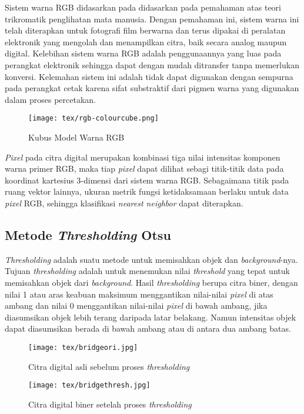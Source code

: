 \documentclass[laporan.tex]{subfiles}
\begin{document}
Sistem warna RGB didasarkan pada didasarkan pada pemahaman atas teori trikromatik penglihatan mata manusia. Dengan pemahaman ini, sistem warna ini telah diterapkan untuk fotografi film berwarna dan terus dipakai di peralatan elektronik yang mengolah dan menampilkan citra, baik secara analog maupun digital. Kelebihan sistem warna RGB adalah penggunaannya yang luas pada perangkat elektronik sehingga dapat dengan mudah ditransfer tanpa memerlukan konversi. Kelemahan sistem ini adalah tidak dapat digunakan dengan sempurna pada perangkat cetak karena sifat substraktif dari pigmen warna yang digunakan dalam proses percetakan. 

\begin{figure}[h!]
\centering
\texttt{[image: tex/rgb-colourcube.png]}
\caption{Kubus Model Warna RGB}
\end{figure}

\emph{Pixel} pada citra digital merupakan kombinasi tiga nilai intensitas komponen warna primer RGB, maka tiap \emph{pixel} dapat dilihat sebagi titik-titik data pada koordinat kartesius 3-dimensi dari sistem warna RGB. Sebagaimana titik pada ruang vektor lainnya, ukuran metrik fungsi ketidaksamaan berlaku untuk data \emph{pixel} RGB, sehingga klasifikasi \emph{nearest neighbor} dapat diterapkan.

\FloatBarrier

\subsection{Metode \emph{Thresholding} Otsu}

\emph{Thresholding} adalah suatu metode untuk memisahkan objek dan \emph{background}-nya. Tujuan \emph{thresholding} adalah untuk menemukan nilai \emph{threshold} yang tepat untuk memisahkan objek dari \emph{background}. Hasil \emph{thresholding} berupa citra biner, dengan nilai 1 atau aras keabuan maksimum menggantikan nilai-nilai \emph{pixel} di atas ambang dan nilai 0 menggantikan nilai-nilai \emph{pixel} di bawah ambang, jika diasumsikan objek lebih terang daripada latar belakang. Namun intensitas objek dapat diasumsikan berada di bawah ambang atau di antara dua ambang batas\cite{shapiro}.

\begin{figure}[h]
\centering
\texttt{[image: tex/bridgeori.jpg]}
\caption{Citra digital asli sebelum proses \emph{thresholding}}
\end{figure}

\begin{figure}[h]
\centering
\texttt{[image: tex/bridgethresh.jpg]}
\caption{Citra digital biner setelah proses \emph{thresholding}}
\end{figure}
\end{document}
